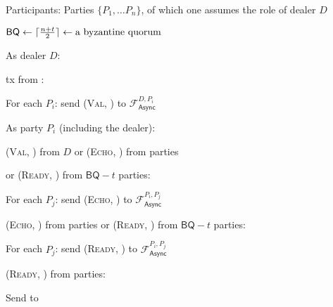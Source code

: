 \begin{bbox}[title={$\Pi_\text{Bracha}$}]

Participants: Parties $\{P_1, \dots P_n\}$, of which one assumes the role of dealer $D$

 $\mathsf{BQ} \leftarrow \lceil\frac{n+t}{2}\rceil \leftarrow \text{a byzantine quorum}$

As dealer $D$:

    \quad \OnInput \textsf{tx} from \Env:
    
        \qquad For each $P_i$: send (\textsc{Val}, ) to $\mathcal{F}_\mathsf{Async}^{D, P_i}$
    
As party $P_i$ (including the dealer):

    \quad \OnInput (\textsc{Val}, ) from $D$ or (\textsc{Echo}, ) from  parties 
    
    \quad or (\textsc{Ready}, ) from $\mathsf{BQ}-t$ parties:
    
        \qquad For each $P_j$: send (\textsc{Echo}, ) to $\mathcal{F}_\mathsf{Async}^{P_i, P_j}$
        
    \quad \OnInput (\textsc{Echo}, ) from  parties or (\textsc{Ready}, ) from $\mathsf{BQ}-t$ parties:
        
        \qquad For each $P_j$: send (\textsc{Ready}, ) to $\mathcal{F}_\mathsf{Async}^{P_i, P_j}$
        
    \quad \OnInput (\textsc{Ready}, ) from  parties:
    
        \qquad Send  to \Env
        
\end{bbox}